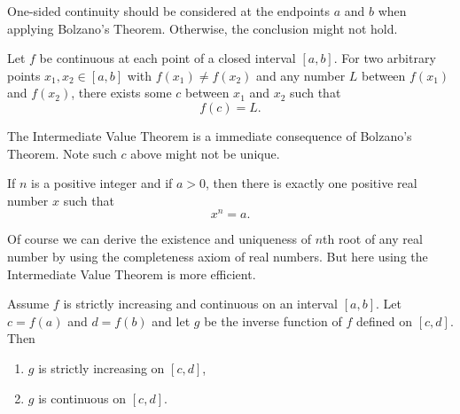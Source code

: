 	\begin{remarkenv}
		One-sided continuity should be considered at the endpoints $a$ and $b$ when applying Bolzano's Theorem. Otherwise, the conclusion might not hold.
	\end{remarkenv}
	\begin{theoremenv}
		Let $f$ be continuous at each point of a closed interval $[a,b]$. For two arbitrary points $x_1,x_2\in[a,b]$ with $f(x_1)\neq f(x_2)$ and any number $L$ between $f(x_1)$ and $f(x_2)$, there exists some $c$ between $x_1$ and $x_2$ such that
		\[
		f(c)=L.
		\]
	\end{theoremenv}
	\begin{remarkenv}
		The Intermediate Value Theorem is a immediate consequence of Bolzano's Theorem. Note such $c$ above might not be unique.
	\end{remarkenv}
	\begin{propositionenv}
		If $n$ is a positive integer and if $a>0$, then there is exactly one positive real number $x$ such that
		\[
		x^n = a.
		\]
	\end{propositionenv}
	\begin{remarkenv}
		Of course we can derive the existence and uniqueness of $n$th root of any real number by using the completeness axiom of real numbers. But here using the Intermediate Value Theorem is more efficient.
	\end{remarkenv}
	\begin{theoremenv}
		Assume $f$ is strictly increasing and continuous on an interval $[a,b]$. Let $c=f(a)$ and $d=f(b)$ and let $g$ be the inverse function of $f$ defined on $[c,d]$. Then
		\begin{enumerate}
			\item $g$ is strictly increasing on $[c,d]$,
			\item $g$ is continuous on $[c,d]$.
		\end{enumerate}
	\end{theoremenv}
